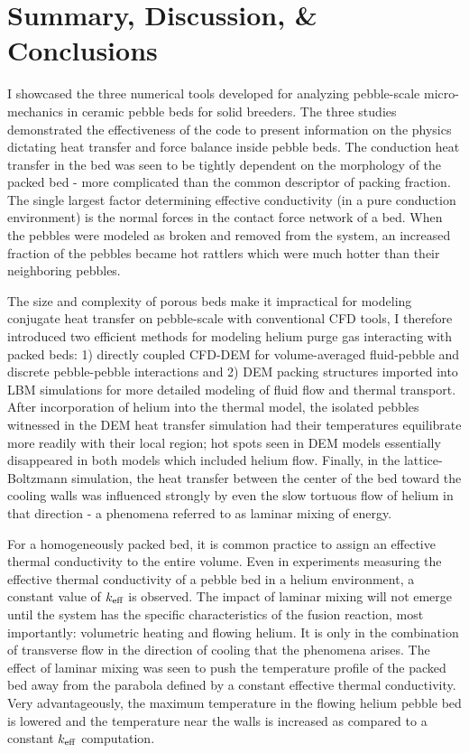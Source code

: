 \section{Summary, Discussion, \& Conclusions}

I showcased the three numerical tools developed for analyzing pebble-scale micro-mechanics in ceramic pebble beds for solid breeders. The three studies demonstrated the effectiveness of the code to present information on the physics dictating heat transfer and force balance inside pebble beds. The conduction heat transfer in the bed was seen to be tightly dependent on the morphology of the packed bed - more complicated than the common descriptor of packing fraction. The single largest factor determining effective conductivity (in a pure conduction environment) is the normal forces in the contact force network of a bed. When the pebbles were modeled as broken and removed from the system, an increased fraction of the pebbles became hot rattlers which were much hotter than their neighboring pebbles. 

The size and complexity of porous beds make it impractical for modeling conjugate heat transfer on pebble-scale with conventional CFD tools, I therefore introduced two efficient methods for modeling helium purge gas interacting with packed beds: 1) directly coupled CFD-DEM for volume-averaged fluid-pebble and discrete pebble-pebble interactions and 2) DEM packing structures imported into LBM simulations for more detailed modeling of fluid flow and thermal transport. After incorporation of helium into the thermal model, the isolated pebbles witnessed in the DEM heat transfer simulation had their temperatures equilibrate more readily with their local region; hot spots seen in DEM models essentially disappeared in both models which included helium flow. Finally, in the lattice-Boltzmann simulation, the heat transfer between the center of the bed toward the cooling walls was influenced strongly by even the slow tortuous flow of helium in that direction - a phenomena referred to as laminar mixing of energy.

For a homogeneously packed bed, it is common practice to assign an effective thermal conductivity to the entire volume. Even in experiments measuring the effective thermal conductivity of a pebble bed in a helium environment, a constant value of $k_\text{eff}$ is observed. The impact of laminar mixing will not emerge until the system has the specific characteristics of the fusion reaction, most importantly: volumetric heating and flowing helium. It is only in the combination of transverse flow in the direction of cooling that the phenomena arises. The effect of laminar mixing was seen to push the temperature profile of the packed bed away from the parabola defined by a constant effective thermal conductivity. Very advantageously, the maximum temperature in the flowing helium pebble bed is lowered and the temperature near the walls is increased as compared to a constant $k_\text{eff}$ computation.


